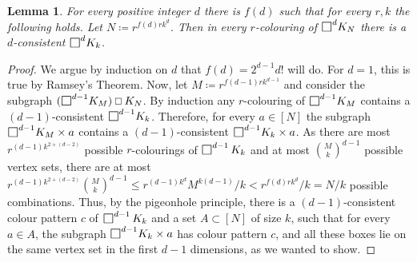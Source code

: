 \documentclass[10pt]{article}
\newtheorem{lemma}[theorem]{Lemma}
\DeclareMathOperator*{\ourbox}{\text{\raisebox{-0.25ex}{\scalebox{1.25}{$\square$}}}}
\newcommand\Osq{\mathbin{\text{\scalebox{.84}{$\square$}}}}
\begin{document}
\begin{lemma}\label{lem: 2}
For every positive integer $d$ there is $f(d)$ such that for every $r,k$ the following holds. Let $N\coloneqq r^{f(d)rk^{d}}$. Then in every $r$-colouring of $\ourbox^{d}\!K_N$ there is a $d$-consistent $\ourbox^{d}\!K_k$. 
\end{lemma}
\begin{proof}
We argue by induction on $d$ that $f(d)=2^{d-1}d!$ will do. For $d=1$, this is true by Ramsey's Theorem. 
Now, let $M\coloneqq r^{f(d-1)rk^{d-1}}$ and consider the subgraph $(\ourbox^{d-1}\!K_{M})\Osq K_N$. By induction any $r$-colouring of $\ourbox^{d-1}\!K_{M}$ contains a $(d-1)$-consistent $\ourbox^{d-1}\!K_k$. Therefore, for every $a\in [N]$ the subgraph $\ourbox^{d-1}\!K_{M}\times a$ contains a $(d-1)$-consistent $\ourbox^{d-1}\!K_k\times a $.
 As there are most $r^{(d-1)k^{2+(d-2)}}$ possible $r$-colourings of $\ourbox^{d-1}K_k$ and at most $\binom{M}{k}^{d-1}$ possible vertex sets, 
 there are at most $r^{(d-1)k^{2+(d-2)}}\binom{M}{k}^{d-1}\le r^{(d-1)k^d}M^{k(d-1)}/k< r^{f(d)rk^d}/k=N/k$ possible combinations.
Thus, by the pigeonhole principle, there is a $(d-1)$-consistent colour pattern $c$ of $\ourbox^{d-1}K_k$ and a set $A\subset [N]$ of size $k$, such that for every $a\in A$, the subgraph $\ourbox^{d-1}\!K_k \times a$ has colour pattern $c$, and all these boxes lie on the same vertex set in the first $d-1$ dimensions, as we wanted to show. 
\end{proof}
\end{document}
